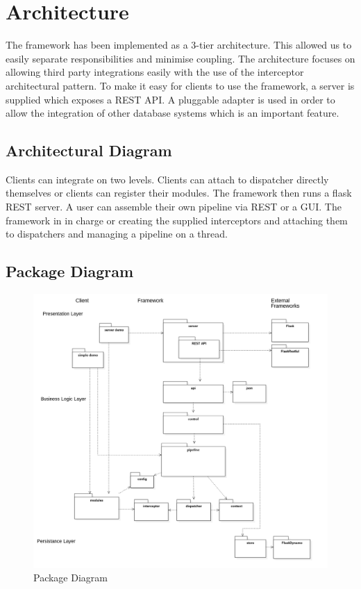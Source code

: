 \chapter{Architecture}

  The framework has been implemented as a 3-tier architecture. This allowed us to easily
  separate responsibilities and minimise coupling. The architecture focuses on allowing
  third party integrations easily with the use of the interceptor architectural pattern.
  To make it easy for clients to use the framework, a server is supplied which exposes
  a REST API. A pluggable adapter is used in order to allow the integration of other
  database systems which is an important feature.

  \section{Architectural Diagram}
  Clients can integrate on two levels. Clients can attach to dispatcher directly themselves or
  clients can register their modules. The framework then runs a flask REST server.
  A user can assemble their own pipeline via REST or a GUI. The framework in in charge or creating
  the supplied interceptors and attaching them to dispatchers and managing a pipeline on a thread.

  \section{Package Diagram}
    \begin{figure}[H]
        \hspace{-8em}
        \includegraphics[width = 1.5\linewidth]{diagrams/architecture.png}
        \caption{Package Diagram}
        \label{fig:architecture_packages}
      \end{figure}

